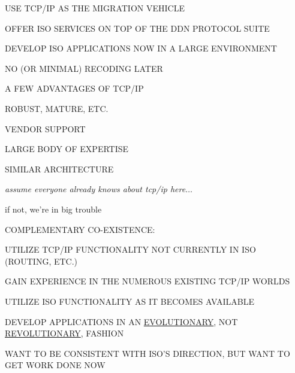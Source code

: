 \begin{bwslide}

\begin{nrtc}
\item	USE TCP/IP AS THE MIGRATION VEHICLE
    \begin{nrtc}
    \item	OFFER ISO SERVICES ON TOP OF THE DDN PROTOCOL SUITE

    \item	DEVELOP ISO APPLICATIONS NOW IN A LARGE ENVIRONMENT

    \item	NO (OR MINIMAL) RECODING LATER
    \end{nrtc}

\item	A FEW ADVANTAGES OF TCP/IP
    \begin{nrtc}
    \item	ROBUST, MATURE, ETC.

    \item	VENDOR SUPPORT

    \item	LARGE BODY OF EXPERTISE

    \item	SIMILAR ARCHITECTURE
    \end{nrtc}
\end{nrtc}
\end{bwslide}


\begin{note}\em
assume everyone already knows about tcp/ip here$\ldots$

if not, we're in big trouble
\end{note}


\begin{bwslide}

\begin{nrtc}
\item	COMPLEMENTARY CO-EXISTENCE:
    \begin{nrtc}
    \item	UTILIZE TCP/IP FUNCTIONALITY NOT CURRENTLY IN ISO\\
		(ROUTING, ETC.)

    \item	GAIN EXPERIENCE IN THE NUMEROUS EXISTING TCP/IP WORLDS

    \item	UTILIZE ISO FUNCTIONALITY AS IT BECOMES AVAILABLE
    \end{nrtc}

\item	DEVELOP APPLICATIONS IN AN \underline{EVOLUTIONARY},
	NOT \underline{REVOLUTIONARY}, FASHION

\item	WANT TO BE CONSISTENT WITH ISO'S DIRECTION,
	BUT WANT TO GET WORK DONE NOW
\end{nrtc}
\end{bwslide}


